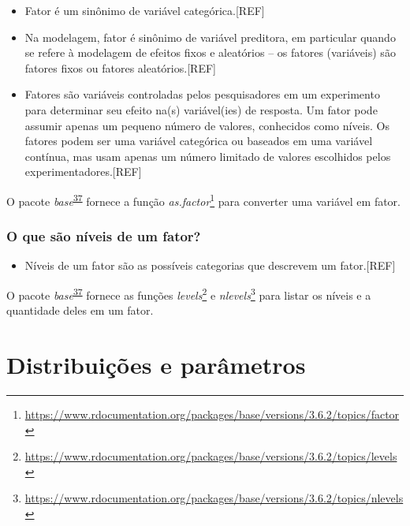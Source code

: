 \documentclass[
  a4paper,
]{book}
\providecommand{\tightlist}{%
  \setlength{\itemsep}{0pt}\setlength{\parskip}{0pt}}
\renewcommand{\href}[2]{#2\footnote{\url{#1}}}
\newenvironment{infobox}[1]
  {
  \begin{itemize}
  \renewcommand{\labelitemi}{
    \raisebox{-.7\height}[0pt][0pt]{
      {\setkeys{Gin}{width=3em,keepaspectratio}
        \texttt{[image: \#1]}}
    }
  }
  \setlength{\fboxsep}{1em}
  \begin{blackbox}
  \item
  }
  {
  \end{blackbox}
  \end{itemize}
  }
\begin{document}
\begin{itemize}
\item
  Fator é um sinônimo de variável categórica.{[}REF{]}
\item
  Na modelagem, fator é sinônimo de variável preditora, em particular quando se refere à modelagem de efeitos fixos e aleatórios -- os fatores (variáveis) são fatores fixos ou fatores aleatórios.{[}REF{]}
\item
  Fatores são variáveis controladas pelos pesquisadores em um experimento para determinar seu efeito na(s) variável(ies) de resposta. Um fator pode assumir apenas um pequeno número de valores, conhecidos como níveis. Os fatores podem ser uma variável categórica ou baseados em uma variável contínua, mas usam apenas um número limitado de valores escolhidos pelos experimentadores.{[}REF{]}
\end{itemize}

\begin{infobox}{images/Rlogo}
O pacote \emph{base}\textsuperscript{\protect\hyperlink{ref-base-2}{37}} fornece a função \href{https://www.rdocumentation.org/packages/base/versions/3.6.2/topics/factor}{\emph{as.factor}} para converter uma variável em fator.

\end{infobox}

\hypertarget{o-que-suxe3o-nuxedveis-de-um-fator}{%
\subsection{O que são níveis de um fator?}\label{o-que-suxe3o-nuxedveis-de-um-fator}}

\begin{itemize}
\tightlist
\item
  Níveis de um fator são as possíveis categorias que descrevem um fator.{[}REF{]}
\end{itemize}

\begin{infobox}{images/Rlogo}
O pacote \emph{base}\textsuperscript{\protect\hyperlink{ref-base-2}{37}} fornece as funções \href{https://www.rdocumentation.org/packages/base/versions/3.6.2/topics/levels}{\emph{levels}} e \href{https://www.rdocumentation.org/packages/base/versions/3.6.2/topics/nlevels}{\emph{nlevels}} para listar os níveis e a quantidade deles em um fator.

\end{infobox}

\hypertarget{distribuicoes-parametros}{%
\chapter{\texorpdfstring{\textbf{Distribuições e parâmetros}}{Distribuições e parâmetros}}\label{distribuicoes-parametros}}
\end{document}
